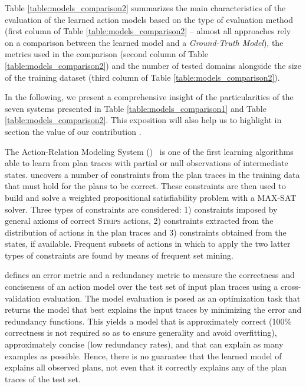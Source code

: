 Table \ref{table:models_comparison2} summarizes the main characteristics of the evaluation of the learned action models based on the type of evaluation method (first column of Table \ref{table:models_comparison2} -- almost all approaches rely on a comparison between the learned model and a {\em Ground-Truth Model}), the metrics used in the comparison (second column of Table \ref{table:models_comparison2}) and the number of tested domains alongside the size of the training dataset (third column of Table \ref{table:models_comparison2}).

In the following, we present a comprehensive insight of the particularities of the seven systems presented in Table \ref{table:models_comparison1} and Table \ref{table:models_comparison2}. This exposition will also help us to highlight in section \label{task_definition} the value of our contribution \FAMA.


\vspace{0.3cm}

The Action-Relation Modeling System (\textbf{\ARMS})~\cite{yang2007learning} is one of the first learning algorithms able to learn from plan traces with partial or null observations of intermediate states. \ARMS uncovers a number of constraints from the plan traces in the training data that must hold for the plans to be correct. These constraints are then used to build and solve a weighted propositional satisfiability problem with a MAX-SAT solver. Three types of constraints are considered: 1) constraints imposed by general axioms of correct \textsc{Strips} actions, 2) constraints extracted from the distribution of actions in the plan traces and 3) constraints obtained from the \PO states, if available. Frequent subsets of actions in which to apply the two latter types of constraints are found by means of frequent set mining.

\ARMS defines an error metric and a redundancy metric to measure the correctness and conciseness of an action model over the test set of input plan traces using a cross-validation evaluation. The model evaluation is posed as an optimization task that returns the model that best explains the input traces by minimizing the error and redundancy functions. This yields a model that is approximately correct (100\% correctness is not required so as to ensure generality and avoid overfitting), approximately concise (low redundancy rates), and that can explain as many examples as possible. Hence, there is no guarantee that the learned model of \ARMS explains all observed plans, not even that it correctly explains any of the plan traces of the test set.

